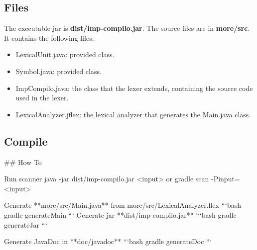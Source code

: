 \documentclass[letterpaper]{article}
\begin{document}
\subsection{Files}

The executable jar is \textbf{dist/imp-compilo.jar}.
The source files are in \textbf{more/src}. It contains the following files:

\begin{itemize}
    \item LexicalUnit.java: provided class.
    \item Symbol.java: provided class.
    \item ImpCompilo.java: the class that the lexer extends, containing the
    source code used in the lexer.
    \item LexicalAnalyzer.jflex: the lexical analyzer that generates the
    Main.java class.
\end{itemize}

\subsection{Compile}

## How To

Run scanner
java -jar dist/imp-compilo.jar <input>
or
gradle scan -Pinput=<input>

Generate **more/src/Main.java** from more/src/LexicalAnalyzer.flex
```bash
gradle generateMain
```
Generate jar **dist/imp-compilo.jar**
```bash
gradle generateJar
```

Generate JavaDoc in **doc/javadoc**
```bash
gradle generateDoc
```
\end{document}
